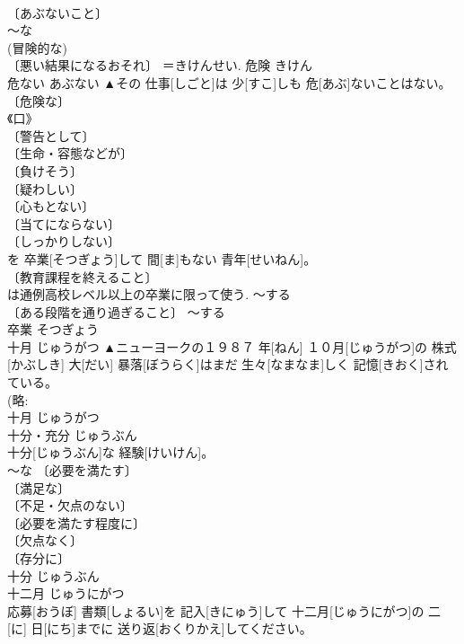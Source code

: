 \documentclass[8pt]{extreport}
\begin{document}
\begin{CJK}{UTF8}{min}
\\	〔あぶないこと〕 
\\	～な 
\\	(冒険的な) 
\\	〔悪い結果になるおそれ〕 ＝きけんせい.	危険	きけん	
\\	危ない	あぶない	▲その 仕事[しごと]は 少[すこ]しも 危[あぶ]ないことはない。	
\\	〔危険な〕 
\\	《口》 
\\	〔警告として〕 
\\	〔生命・容態などが〕 
\\	〔負けそう〕 
\\	〔疑わしい〕 
\\	〔心もとない〕 
\\	〔当てにならない〕 
\\	〔しっかりしない〕 
\\	[⇒あやしい 
\\	〔間一髪の〕 
\\	〔(人物が)正常ではない; 通例アブナイと表記〕 
\\	危ない	あぶない	
\\	卒業	そつぎょう	
\\	大学[だいがく]を 卒業[そつぎょう]して 間[ま]もない 青年[せいねん]。	
\\	〔教育課程を終えること〕 
\\	は通例高校レベル以上の卒業に限って使う. ～する 
\\	〔ある段階を通り過ぎること〕 ～する 
\\	卒業	そつぎょう	
\\	十月	じゅうがつ	▲ニューヨークの１９８７ 年[ねん] １０月[じゅうがつ]の 株式[かぶしき] 大[だい] 暴落[ぼうらく]はまだ 生々[なまなま]しく 記憶[きおく]されている。	
\\	(略: 
\\	十月	じゅうがつ	
\\	十分・充分	じゅうぶん	
\\	十分[じゅうぶん]な 経験[けいけん]。	
\\	～な 〔必要を満たす〕 
\\	〔満足な〕 
\\	〔不足・欠点のない〕 
\\	〔必要を満たす程度に〕 
\\	〔欠点なく〕 
\\	〔存分に〕 
\\	十分	じゅうぶん	
\\	十二月	じゅうにがつ	
\\	応募[おうぼ] 書類[しょるい]を 記入[きにゅう]して 十二月[じゅうにがつ]の 二[に] 日[にち]までに 送り返[おくりかえ]してください。	

\end{CJK}
\end{document}
